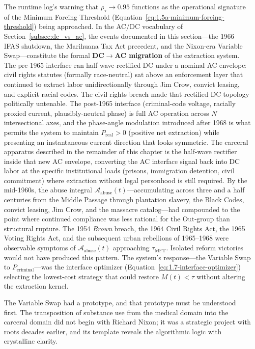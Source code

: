 The runtime log's warning that $\rho_{\tau} \to 0.95$ functions as the operational signature of the Minimum Forcing Threshold (Equation~\ref{eq:1.5a-minimum-forcing-threshold}) being approached. In the AC/DC vocabulary of Section~\ref{subsec:dc_vs_ac}, the events documented in this section---the 1966 IFAS shutdown, the Marihuana Tax Act precedent, and the Nixon-era Variable Swap---constitute the formal \textbf{DC$\to$AC migration} of the extraction system. The pre-1965 interface ran half-wave-rectified DC under a nominal AC envelope: civil rights statutes (formally race-neutral) sat above an enforcement layer that continued to extract labor unidirectionally through Jim Crow, convict leasing, and explicit racial codes. The civil rights breach made that rectified DC topology politically untenable. The post-1965 interface (criminal-code voltage, racially proxied current, plausibly-neutral phase) is full AC operation across $N$ intersectional axes, and the phase-angle modulation introduced after 1968 is what permits the system to maintain $P_{\text{real}} > 0$ (positive net extraction) while presenting an instantaneous current direction that looks symmetric. The carceral apparatus described in the remainder of this chapter is the half-wave rectifier inside that new AC envelope, converting the AC interface signal back into DC labor at the specific institutional loads (prisons, immigration detention, civil commitment) where extraction without legal personhood is still required. By the mid-1960s, the abuse integral $\mathcal{A}_{\text{abuse}}(t)$---accumulating across three and a half centuries from the Middle Passage through plantation slavery, the Black Codes, convict leasing, Jim Crow, and the massacre catalog---had compounded to the point where continued compliance was less rational for the Out-group than structural rupture. The 1954 \textit{Brown} breach, the 1964 Civil Rights Act, the 1965 Voting Rights Act, and the subsequent urban rebellions of 1965--1968 were observable symptoms of $\mathcal{A}_{\text{abuse}}(t)$ approaching $\tau_{\text{MFT}}$. Isolated reform victories would not have produced this pattern. The system's response---the Variable Swap to $P_{\text{criminal}}$---was the interface optimizer (Equation~\ref{eq:1.7-interface-optimizer}) selecting the lowest-cost strategy that could restore $M(t) < \tau$ without altering the extraction kernel.

The Variable Swap had a prototype, and that prototype must be understood first. The transposition of substance use from the medical domain into the carceral domain did not begin with Richard Nixon; it was a strategic project with roots decades earlier, and its template reveals the algorithmic logic with crystalline clarity.

